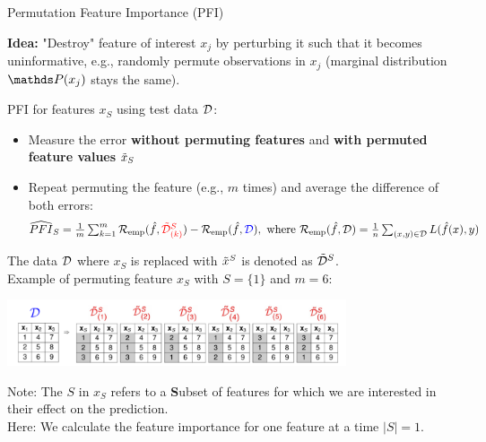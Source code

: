 \documentclass[11pt,compress,t,notes=noshow, aspectratio=169, xcolor=table]{beamer}
\begin{document}

\begin{frame}{Permutation Feature Importance (PFI) }



\textbf{Idea:} "Destroy" feature of interest $x_j$ by perturbing it such that it becomes uninformative, e.g., randomly permute observations in $x_j$ (marginal distribution $\P(x_j)$ stays the same).  %

PFI for features $x_S$ using test data $\D$:
\begin{itemize}
  \item Measure the error {\color{blue}\textbf{without permuting features}} and {\color{red}\textbf{with permuted feature values}} $\pert{x}{}{}_S$
  \item Repeat permuting the feature (e.g., $m$ times) and average the difference of both errors: 
$$\widehat{PFI}_S = \tfrac{1}{m} \textstyle\sum\nolimits_{k = 1}^{m} \riske (\fh, {\color{red}\pert{\D}{S}{}_{(k)}}) - \riske (\fh, {\color{blue}\D}), \text{ where }
\riske(\fh, \D) = \frac{1}{n} \sum\nolimits_{(x, y) \in \D}  L(\fh(x), y)$$
\end{itemize}
\pause
The data $\D$ where $x_S$ is replaced with $\pert{x}{S}{}$ is denoted as $\pert{\D}{S}{}$.\\
Example of permuting feature $x_S$ with $S = \{1\}$ and $m=6$:

\begin{center}
\includegraphics[width=0.75\textwidth]{figure_man/permuted-fv.pdf}
\end{center}

\vspace*{0.2cm}
{\scriptsize{Note: 
The $S$ in $x_S$ refers to a \textbf{S}ubset of features for which we are interested in their effect on the prediction.\\
Here: We calculate the feature importance for one feature at a time $|S| = 1$.}\par}

\end{frame}
\end{document}
